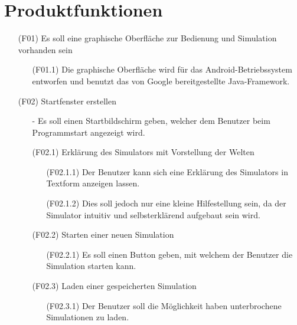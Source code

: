 \documentclass[a4paper, 10pt]{article}
\begin{document}
\section{Produktfunktionen}
\begin{enumerate}
\item[(F01)]
Es soll eine graphische Oberfläche zur Bedienung und Simulation vorhanden sein

\begin{enumerate}
\item[(F01.1)] 
Die graphische Oberfläche wird für das Android-Betriebssystem entworfen und benutzt das von Google 		bereitgestellte Java-Framework. 
\end{enumerate}

\item[(F02)] Startfenster erstellen
\begin{enumerate}
\item [-]
Es soll einen Startbildschirm geben, welcher dem Benutzer beim Programmstart angezeigt wird.
\end{enumerate}

\begin{enumerate}
\item [(F02.1)] 
Erklärung des Simulators mit Vorstellung der Welten

\begin{enumerate}
\item [(F02.1.1)] 
Der Benutzer kann sich eine Erklärung des Simulators in Textform anzeigen lassen. 
\item [(F02.1.2)]
Dies soll jedoch nur eine kleine Hilfestellung sein, da der Simulator intuitiv und selbsterklärend aufgebaut sein wird.
\end{enumerate}


\item[(F02.2)]Starten einer neuen Simulation
\begin{enumerate}
\item [(F02.2.1)] Es soll einen Button geben, mit welchem der Benutzer die Simulation starten kann.
\end{enumerate}

\item[(F02.3)]Laden einer gespeicherten Simulation
\begin{enumerate}
\item [(F02.3.1)]Der Benutzer soll die Möglichkeit haben unterbrochene Simulationen zu laden.
\end{enumerate}


\end{enumerate}
\end{enumerate}
\end{document}

